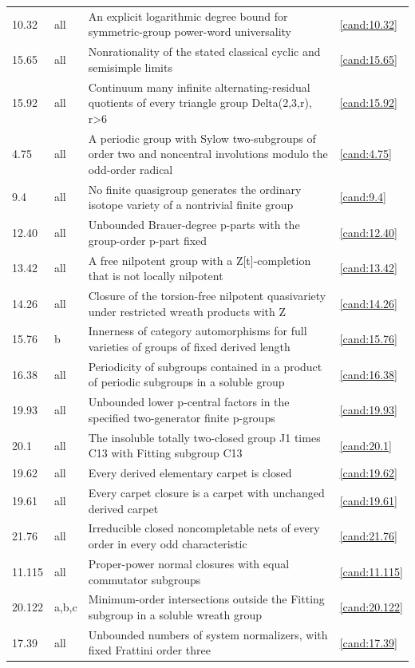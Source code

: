 \begin{longtable}{@{}p{}p{}>{\raggedright\arraybackslash}p{}p{}@{}}
10.32 & all & An explicit logarithmic degree bound for symmetric-group power-word universality & \ref{cand:10.32} \\
15.65 & all & Nonrationality of the stated classical cyclic and semisimple limits & \ref{cand:15.65} \\
15.92 & all & Continuum many infinite alternating-residual quotients of every triangle group Delta(2,3,r), r>6 & \ref{cand:15.92} \\
4.75 & all & A periodic group with Sylow two-subgroups of order two and noncentral involutions modulo the odd-order radical & \ref{cand:4.75} \\
9.4 & all & No finite quasigroup generates the ordinary isotope variety of a nontrivial finite group & \ref{cand:9.4} \\
12.40 & all & Unbounded Brauer-degree p-parts with the group-order p-part fixed & \ref{cand:12.40} \\
13.42 & all & A free nilpotent group with a Z[t]-completion that is not locally nilpotent & \ref{cand:13.42} \\
14.26 & all & Closure of the torsion-free nilpotent quasivariety under restricted wreath products with Z & \ref{cand:14.26} \\
15.76 & b & Innerness of category automorphisms for full varieties of groups of fixed derived length & \ref{cand:15.76} \\
16.38 & all & Periodicity of subgroups contained in a product of periodic subgroups in a soluble group & \ref{cand:16.38} \\
19.93 & all & Unbounded lower p-central factors in the specified two-generator finite p-groups & \ref{cand:19.93} \\
20.1 & all & The insoluble totally two-closed group J1 times C13 with Fitting subgroup C13 & \ref{cand:20.1} \\
19.62 & all & Every derived elementary carpet is closed & \ref{cand:19.62} \\
19.61 & all & Every carpet closure is a carpet with unchanged derived carpet & \ref{cand:19.61} \\
21.76 & all & Irreducible closed noncompletable nets of every order in every odd characteristic & \ref{cand:21.76} \\
11.115 & all & Proper-power normal closures with equal commutator subgroups & \ref{cand:11.115} \\
20.122 & a,b,c & Minimum-order intersections outside the Fitting subgroup in a soluble wreath group & \ref{cand:20.122} \\
17.39 & all & Unbounded numbers of system normalizers, with fixed Frattini order three & \ref{cand:17.39} \\
\end{longtable}
\normalsize
